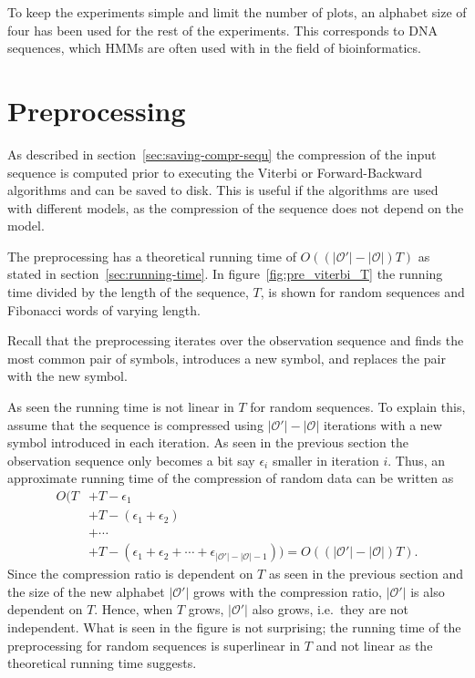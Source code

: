 To keep the experiments simple and limit the number of plots, an alphabet
size of four has been used for the rest of the experiments. This corresponds
to DNA sequences, which HMMs are often used with in the field of bioinformatics.

\section{Preprocessing}

As described in section~\ref{sec:saving-compr-sequ} the compression of the
input sequence is computed prior to executing the Viterbi or Forward-Backward
algorithms and can be saved to disk. This is useful if the algorithms are used with different
models, as the compression of the sequence does not depend on the model.

The preprocessing has a theoretical running time of
$O(( \lvert\mathcal{O'}\rvert - \lvert{\mathcal{O}}\rvert) T)$ as stated in
section~\ref{sec:running-time}. In figure~\ref{fig:pre_viterbi_T} the running
time divided by the length of the sequence, $T$, is shown for random sequences
and Fibonacci words of varying length.

Recall that the preprocessing iterates over the observation sequence and finds
the most common pair of symbols, introduces a new symbol, and replaces the pair
with the new symbol.

As seen the running time is not linear in $T$ for random sequences. To explain
this, assume that the sequence is compressed using
$\lvert\mathcal{O'}\rvert - \lvert{\mathcal{O}}\rvert$ iterations with a new
symbol introduced in each iteration. As seen in the previous section the
observation sequence only becomes a bit say $\epsilon_i$ smaller in iteration
$i$. Thus, an approximate running time of the compression of random data can be
written as
\begin{equation*}
  \begin{aligned}
    O(T & + T - \epsilon_1                \\
        & + T - (\epsilon_1 + \epsilon_2) \\
        & + \cdots                        \\
        & + T -(\epsilon_1 + \epsilon_2 + \cdots + \epsilon_{\lvert\mathcal{O'}\rvert - \lvert{\mathcal{O}}\rvert - 1})) = O\left((\lvert\mathcal{O'}\rvert - \lvert{\mathcal{O}}\rvert) T \right) .
  \end{aligned}
\end{equation*}
Since the compression ratio is dependent on $T$ as seen in the previous section
and the size of the new alphabet $\lvert\mathcal{O'}\rvert$ grows with the
compression ratio, $\lvert\mathcal{O'}\rvert$ is also dependent on $T$. Hence,
when $T$ grows, $\lvert\mathcal{O'}\rvert$ also grows, i.e.\ they are not
independent. What is seen in the figure is not surprising; the running
time of the preprocessing for random sequences is superlinear in $T$ and not
linear as the theoretical running time suggests.

